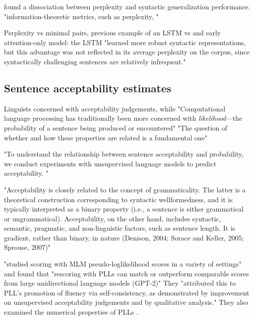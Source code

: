 \citet{hu2020systematic} found a dissociation between perplexity and syntactic generalization performance.
"information-theoretic metrics, such as perplexity, "  \citep{hu2020systematic}

Perplexity vs minimal pairs, previous example of an LSTM vs and early attention-only model: the LSTM "learned more robust syntactic representations, but this advantage was not reflected in its average perplexity on the corpus, since syntactically challenging sentences are relatively infrequent." \citep{marvin2018targeted}


\subsection{Sentence acceptability estimates}

Linguists concerned with acceptability judgements, while "Computational language processing has traditionally been more
concerned with \textit{likelihood}—the probability of a
sentence being produced or encountered" \cite{lau2020furiously}
"The question of whether and how these properties are related is a fundamental one" \citep{lau2020furiously}

"To understand the relationship between sentence acceptability and probability, we conduct experiments with unsupervised language models
to predict acceptability. " \citep{lau2020furiously}

"Acceptability is closely related to the concept of grammaticality. The latter is a theoretical construction corresponding to syntactic wellformedness, and it is typically interpreted as a binary property (i.e., a sentence is either grammatical or ungrammatical). Acceptability, on the other hand, includes syntactic, semantic, pragmatic, and non-linguistic factors, such as sentence
length. It is gradient, rather than binary, in nature
(Denison, 2004; Sorace and Keller, 2005; Sprouse,
2007)" \citep{lau2020furiously}


\citet{salazar2020masked} "studied scoring with MLM pseudo-loglikelihood scores in a variety of settings" and found that "rescoring with PLLs can match or outperform comparable scores from large unidirectional language models (GPT-2)" They "attributed this to PLL’s promotion of fluency via self-consistency, as demonstrated by improvement on unsupervised acceptability judgements and by qualitative analysis."
They also examined the numerical properties of PLLs \citep{salazar2020masked}.

